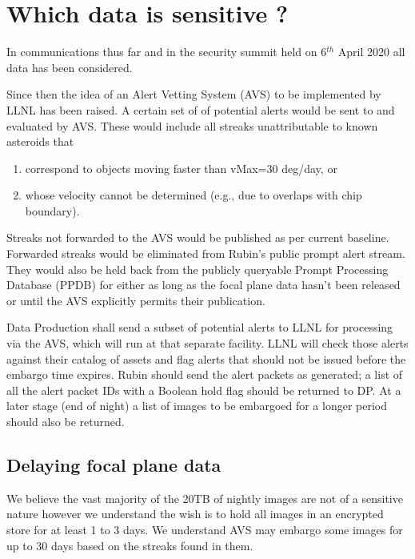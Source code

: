 \section{Which data is sensitive ?} \label{sec:which}

In communications thus far and in the security summit held on 6$^{th}$ April 2020 all data has been considered.

Since then the idea of an Alert Vetting System (AVS) to be implemented by LLNL has been raised.
A certain set of of potential alerts  would be sent to  and evaluated by AVS.
These would include  all streaks unattributable to known asteroids that
\begin{enumerate}
\item correspond to objects moving faster than vMax=30 deg/day, or
\item  whose velocity cannot be determined (e.g., due to overlaps with chip boundary).
\end{enumerate}
Streaks not forwarded to the AVS would be published as per current baseline.
Forwarded streaks would be eliminated from Rubin’s public prompt alert stream.
They would also be held back from the publicly queryable Prompt Processing Database (PPDB) for either as long as the focal plane data hasn’t been released  or until the AVS explicitly permits their publication.

 { Data Production  shall send a subset of potential alerts to LLNL for processing via the AVS, which will run at that separate facility. LLNL will check those alerts against their catalog of assets and flag alerts that should not be issued before the embargo time expires. Rubin should send the alert packets as generated; a list of all the alert packet IDs with a Boolean hold flag should be returned to DP. At a later stage (end of night) a list of images to be embargoed for a longer period should also be returned.}

\subsection{Delaying focal plane data}
We believe the vast majority of the 20TB of nightly images are not of a sensitive nature however we understand the wish is to hold all images in an encrypted store for at least 1 to 3 days.
We understand AVS may embargo some images for up to 30 days based on the streaks found in them.




